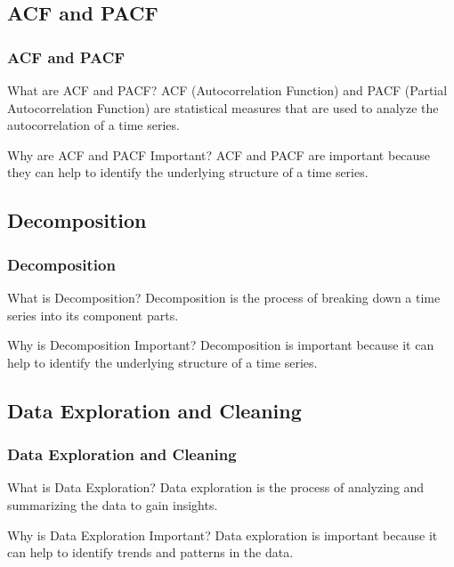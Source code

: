 \documentclass[aspectratio=169, hideothersubsections]{beamer}
\begin{document}
\subsection{ACF and PACF}

\begin{frame}
  \frametitle{ACF and PACF}
  \begin{block}{What are ACF and PACF?}
    ACF (Autocorrelation Function) and PACF (Partial Autocorrelation Function) are statistical measures that are used to analyze the autocorrelation of a time series.
  \end{block}
  \begin{block}{Why are ACF and PACF Important?}
    ACF and PACF are important because they can help to identify the underlying structure of a time series.
  \end{block}
\end{frame}

\subsection{Decomposition}

\begin{frame}
  \frametitle{Decomposition}
  \begin{block}{What is Decomposition?}
    Decomposition is the process of breaking down a time series into its component parts.
  \end{block}
  \begin{block}{Why is Decomposition Important?}
    Decomposition is important because it can help to identify the underlying structure of a time series.
  \end{block}
\end{frame}

\subsection{Data Exploration and Cleaning}

\begin{frame}
  \frametitle{Data Exploration and Cleaning}
  \begin{block}{What is Data Exploration?}
    Data exploration is the process of analyzing and summarizing the data to gain insights.
  \end{block}
  \begin{block}{Why is Data Exploration Important?}
    Data exploration is important because it can help to identify trends and patterns in the data.
  \end{block}
\end{frame}
\end{document}
